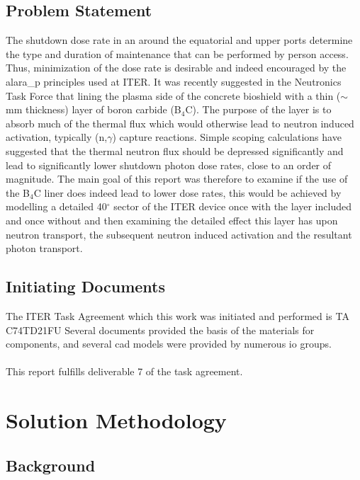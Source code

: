 \documentclass[12pt]{article}
\begin{document}
\subsection{Problem Statement}
The shutdown dose rate in an around the equatorial and upper ports determine the
type and duration of maintenance that can be performed by person access. Thus,
minimization of the dose rate is desirable and indeed encouraged by the \gls{alara_p}
principles used at ITER. It was recently suggested in the Neutronics Task Force
that lining the plasma side of the concrete bioshield with a thin ($\sim$ mm
thickness) layer of boron carbide (B$_4$C). The purpose of the layer is to
absorb much of the thermal flux which would otherwise lead to neutron induced
activation, typically (n,$\gamma$) capture reactions. Simple scoping
calculations have suggested that the thermal neutron flux should be depressed
significantly and lead to significantly lower shutdown photon dose rates, close
to an order of magnitude. The main goal of this report was therefore to examine
if the use of the B$_4$C liner does indeed lead to lower dose rates, this would
be achieved by modelling a detailed 40$^{\circ}$ sector of the ITER device once
with the layer included and once without and then examining the detailed effect
this layer has upon neutron transport, the subsequent neutron induced activation
and the resultant photon transport.
\subsection{Initiating Documents}
The ITER Task Agreement which this work was initiated and performed is TA
C74TD21FU Several documents provided the basis of the materials for components,
and several \gls{cad} models were provided by numerous \gls{io} groups.
\\
\\
This report fulfills deliverable 7 of the task agreement.
\newpage
\section{Solution Methodology}
\subsection{Background}
\end{document}
